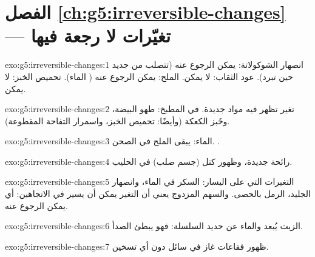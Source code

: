 \section*{الفصل \ref{ch:g5:irreversible-changes} --- تغيّرات لا رجعة فيها}

\begin{solution}{exo:g5:irreversible-changes:1}
انصهار الشوكولاتة: يمكن الرجوع عنه (تتصلب من جديد حين تبرد).  عود
الثقاب: لا يمكن.  الملح: يمكن الرجوع عنه ( الماء).
تحميص الخبز: لا يمكن.
\end{solution}

\begin{solution}{exo:g5:irreversible-changes:2}
تغير تظهر فيه مواد جديدة. في المطبخ: طهو البيضة، وخَبز الكعكة (وأيضًا:
تحميص الخبز، واسمرار التفاحة المقطوعة).
\end{solution}

\begin{solution}{exo:g5:irreversible-changes:3}
 الماء: يبقى الملح في الصحن.  .
\end{solution}

\begin{solution}{exo:g5:irreversible-changes:4}
رائحة جديدة، وظهور كتل (جسم صلب) في الحليب.
\end{solution}

\begin{solution}{exo:g5:irreversible-changes:5}
التغيرات التي على اليسار:  السكر في الماء، وانصهار الجليد، 
الرمل بالحصى. والسهم المزدوج يعني أن التغير يمكن أن يسير في الاتجاهين:
أي يمكن الرجوع عنه.
\end{solution}

\begin{solution}{exo:g5:irreversible-changes:6}
الزيت يُبعد  والماء عن حديد السلسلة: فهو يبطئ
الصدأ.
\end{solution}

\begin{solution}{exo:g5:irreversible-changes:7}
ظهور فقاعات غاز في سائل دون أي تسخين.
\end{solution}

